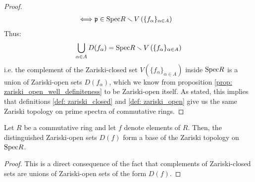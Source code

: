 \begin{proof}
$$\begin{aligned}
                                \iff & \mathfrak{p} \in \mathrm{Spec} R \smallsetminus V\left(\{f_{\alpha}\}_{\alpha \in A}\right)
                            \end{aligned}
                        $$
                    Thus:
                        $$\bigcup_{\alpha \in A} D(f_{\alpha}) = \mathrm{Spec} R \smallsetminus V\left(\{f_{\alpha}\}_{\alpha \in A}\right)$$
                    i.e. the complement of the Zariski-closed set $V\left(\{f_{\alpha}\}_{\alpha \in A}\right)$ inside $\mathrm{Spec} R$ is a union of Zariski-open sets $D(f_{\alpha})$, which we know from proposition \ref{prop: zariski_open_well_definiteness} to be Zariski-open itself. As stated, this implies that definitions \ref{def: zariski_closed} and \ref{def: zariski_open} give us the same Zariski topology on prime spectra of commutative rings.
                \end{proof}
            \begin{corollary} \label{coro: zariski_basis}
                Let $R$ be a commutative ring and let $f$ denote elements of $R$. Then, the distinguished Zariski-open sets $D(f)$ form a base of the Zariski topology on $\mathrm{Spec} R$.
            \end{corollary}
                \begin{proof}
                    This is a direct consequence of the fact that complements of Zariski-closed sets are unions of Zariski-open sets of the form $D(f)$.
                \end{proof}
            
